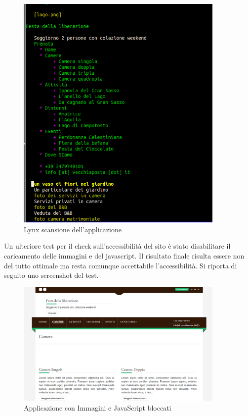 \documentclass[a4paper,12pt,hidelinks]{report}
\begin{document}
\begin{figure}[h!]%
    \includegraphics[width=0.9\textwidth,keepaspectratio=true]{../img/lynx}
    \centering
    \caption{Lynx scansione dell'applicazione}%
    \label{fig:lynx}%
\end{figure}

\newpage
\par Un ulteriore test per il check sull'accessibilità del sito è stato disabilitare il caricamento delle immagini e del javascript. Il risultato finale risulta essere non del 
tutto ottimale ma resta comunque accettabile l'accessibilità. Si riporta di seguito uno screenshot del test.
\begin{figure}[h!]%
    \includegraphics[width=0.9\textwidth,keepaspectratio=true]{../img/noJsNoImg}
    \centering
    \caption{Applicazione con Immagini e JavaScript bloccati}%
    \label{fig:noJsNoImg}%
\end{figure}
\end{document}
